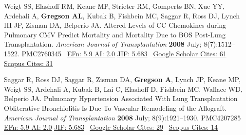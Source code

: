 \documentclass[letterpaper,10pt,sans,dvipsnames,final]{moderncv}%
\begin{document}
\begin{thebibliography}{1}
 \bibitem[7]{} Weigt SS, Elashoff RM, Keane MP, Strieter RM, Gomperts BN, Xue YY,  Ardehali A, \textbf{Gregson AL}, Kubak B, Fishbein MC, Saggar R, Ross DJ, Lynch III JP, Zisman DA, Belperio JA. Altered Levels of CC Chemokines during Pulmonary CMV Predict Mortality and Mortality Due to BOS Post-Lung Transplantation. {\color{BrickRed}\textit{American Journal of Transplantation}} \textbf{2008} July; 8(7):1512--1522. \href{http://dx.doi.org/10.1111/j.1600-6143.2008.02280.x}{\aiDoi} {\smaller PMC2760345}~
   {\color{NavyBlue}\href{http://52.6.43.8/projects/journalRank/rankings.php?bsearch=AMERICAN+JOURNAL+OF+TRANSPLANTATION&searchby=journal&orderby=eigenfactor}{{\smaller EFn: 5.9 AI: 2.0}} 
       \href{http://admin-apps.webofknowledge.com/JCR/JCR?RQ=RECORD&rank=1&journal=AM+J+TRANSPLANT}{{\smaller JIF: 5.683}}~
       \href{http://scholar.google.com/scholar?cites=12767584017196486186&as_sdt=2005&sciodt=0,5&hl=en}{{\smaller Google Scholar Cites: 61}}~
       \href{http://www.scopus.com/record/display.url?eid=2-s2.0-47249111662&origin=inward&txGid=2728424DD3A06399B3857C04F09A7B4B.N5T5nM1aaTEF8rE6yKCR3A%3a25}{{\smaller Scopus Cites: 31}}
       }

 \bibitem[8]{} Saggar R, Ross DJ, Saggar R, Zisman DA, \textbf{Gregson A}, Lynch JP, Keane MP, Weigt SS, Ardehali A, Kubak B, Lai C, Elashoff D, Fishbein MC, Wallace WD,  Belperio JA.  Pulmonary Hypertension Associated With Lung Transplantation Obliterative Bronchiolitis Is Due To Vascular Remodeling of the Allograft. {\color{BrickRed}\textit{American Journal of Transplantation}} \textbf{2008} July; 8(9):1921--1930. \href{http://dx.doi.org/10.1111/j.1600-6143.2008.02338.x}{\aiDoi} {\smaller PMC4207285}~  
   {\color{NavyBlue}\href{http://52.6.43.8/projects/journalRank/rankings.php?bsearch=AMERICAN+JOURNAL+OF+TRANSPLANTATION&searchby=journal&orderby=eigenfactor}{{\smaller EFn: 5.9 AI: 2.0}} 
       \href{http://admin-apps.webofknowledge.com/JCR/JCR?RQ=RECORD&rank=1&journal=AM+J+TRANSPLANT}{{\smaller JIF: 5.683}}~
       \href{http://scholar.google.com/scholar?cites=5026516916977893041&as_sdt=2005&sciodt=0,5&hl=en}{{\smaller Google Scholar Cites: 29}}~
       \href{http://www.scopus.com/record/display.url?eid=2-s2.0-49649092875&origin=inward&txGid=2728424DD3A06399B3857C04F09A7B4B.N5T5nM1aaTEF8rE6yKCR3A%3a23}{{\smaller Scopus Cites: 14}}
       }


\end{thebibliography}
\end{document}
